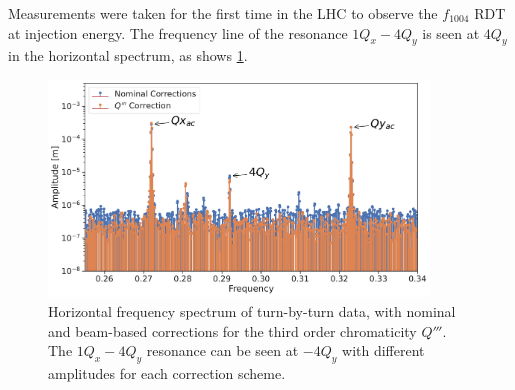 
Measurements were taken for the first time in the LHC to observe the $f_{1004}$ RDT
at injection energy. The frequency line of the resonance $1Q_x - 4Q_y$ is seen at $4Q_y$ in the
horizontal spectrum, as shows \cref{fig:decapoles:rdts:spectrum_f1004}.

\begin{figure}[!htb]
    \centering
    \includegraphics[width=0.9\textwidth]{./images/f1004x_spectrum.pdf}
    \caption{Horizontal frequency spectrum of turn-by-turn data, with nominal and beam-based
    corrections for the third order chromaticity $Q'''$. The $1Q_x - 4Q_y$ resonance can be seen
    at $-4Q_y$ with different amplitudes for each correction scheme.}
    \label{fig:decapoles:rdts:spectrum_f1004}
\end{figure}

%


